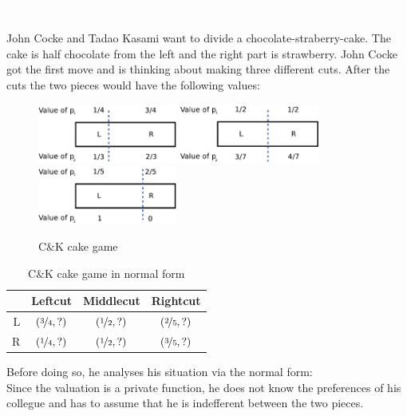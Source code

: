 \begin{bsp}
\label{bsp1}
\textcolor{white}{x}\\\\
John Cocke and Tadao Kasami want to divide a chocolate-straberry-cake. The cake is half chocolate from the left and the right part is strawberry. John Cocke got the first move and is thinking about making three different cuts. After the cuts the two pieces would have the following values:
	\begin{figure}[!h]
		\centering
 		 \includegraphics[width=130pt]{bilder/ex1.pdf}
 		 \includegraphics[width=130pt]{bilder/ex2.pdf}
 		 \includegraphics[width=130pt]{bilder/ex3.pdf}
   \caption{C$\&$K cake game}
  	 \end{figure}
  	 \newline
\begin{table}[htb]
\centering
 \renewcommand{\arraystretch}{1.2} 
\begin{tabular}{c|c|c|c|}
\cline{2-4}
&\multicolumn{1}{|c|}{{Leftcut}}& {Middlecut}&{Rightcut}\\
\hline
\multicolumn{1}{|r|}{{L}}&$\left(\nicefrac{3}{4}, ?\right)$&$\left(\nicefrac{1}{2}, ?\right)$&$\left(\nicefrac{2}{5}, ?\right)$\\
\hline
\multicolumn{1}{|r|}{{R}}&$\left(\nicefrac{1}{4}, ?\right)$&$\left(\nicefrac{1}{2}, ?\right)$&$\left(\nicefrac{3}{5}, ?\right)$\\
\hline
\end{tabular}
\caption{C$\&$K cake game in normal form}\label{Table1}
\end{table}
Before doing so, he analyses his situation via the normal form:\\Since the valuation is a private function, he does not know the preferences of his collegue and has to assume that he is indefferent between the two pieces. %

\end{bsp}
